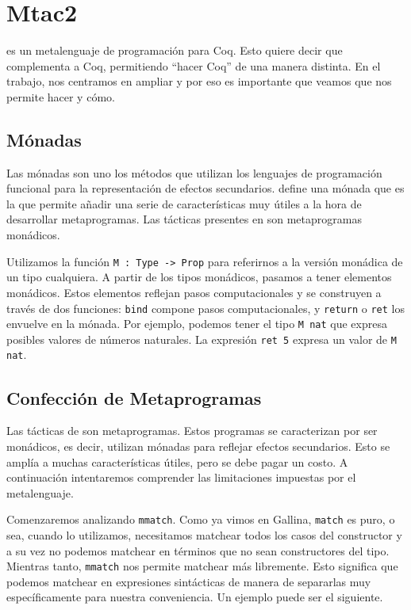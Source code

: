 \chapter{Mtac2}\label{ch:mtac2}

\Mtac \cite{DBLP:journals/pacmpl/KaiserZKRD18} es un metalenguaje de programación para Coq. Esto quiere decir que complementa a Coq, permitiendo ``hacer Coq'' de una manera distinta. En el trabajo, nos centramos en ampliar \Mtac y por eso es importante que veamos que nos permite hacer y cómo.

\section{Mónadas}

Las mónadas son uno los métodos que utilizan los lenguajes de programación funcional para la representación de efectos secundarios.
\Mtac define una mónada que es la que permite añadir una serie de características muy útiles a la hora de desarrollar metaprogramas.
Las tácticas presentes en \mtac son metaprogramas monádicos.

Utilizamos la función \lstinline{M : Type -> Prop} para referirnos a la versión monádica de un tipo cualquiera. A partir de los tipos monádicos, pasamos a tener elementos monádicos. Estos elementos reflejan pasos computacionales y se construyen a través de dos funciones: \lstinline{bind} compone pasos computacionales, y \lstinline{return} o \lstinline{ret} los envuelve en la mónada. Por ejemplo, podemos tener el tipo \lstinline{M nat} que expresa posibles valores de números naturales. La expresión \lstinline{ret 5} expresa un valor de \lstinline{M nat}.

\section{Confección de Metaprogramas}

Las tácticas de \mtac son metaprogramas.
Estos programas se caracterizan por ser monádicos, es decir, utilizan mónadas para reflejar efectos secundarios.
Esto se amplía a muchas características útiles, pero se debe pagar un costo.
A continuación intentaremos comprender las limitaciones impuestas por el metalenguaje.

Comenzaremos analizando \lstinline{mmatch}. Como ya vimos en Gallina, \lstinline{match} es puro, o sea, cuando lo utilizamos, necesitamos matchear todos los casos del constructor y a su vez no podemos matchear en términos que no sean constructores del tipo.
Mientras tanto, \lstinline{mmatch} nos permite matchear más libremente.
Esto significa que podemos matchear en expresiones sintácticas de manera de separarlas muy específicamente para nuestra conveniencia.
Un ejemplo puede ser el siguiente.

